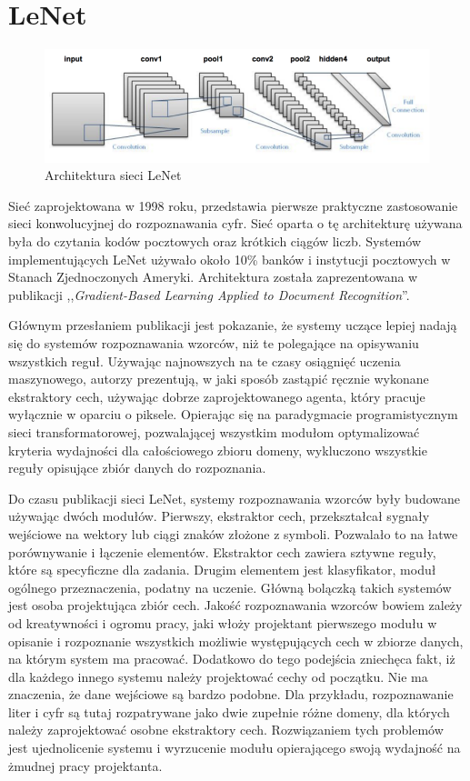 \documentclass[12pt,a4paper,twoside,titlepage,openright]{book}
\begin{document}
\section{LeNet}
\begin{figure}[ht]
	\centering
			\includegraphics[resolution=100, scale=0.6]{LeNet.png}
		\caption{Architektura sieci LeNet}
\end{figure}

Sieć zaprojektowana w 1998 roku, przedstawia pierwsze praktyczne zastosowanie sieci konwolucyjnej do rozpoznawania cyfr. Sieć oparta o tę architekturę używana była do czytania kodów pocztowych oraz krótkich ciągów liczb. Systemów implementujących LeNet używało około 10\% banków i instytucji pocztowych w Stanach Zjednoczonych Ameryki. Architektura została zaprezentowana w publikacji ,,\textit{Gradient-Based Learning Applied to Document Recognition}''.

Głównym przesłaniem publikacji jest pokazanie, że systemy uczące lepiej nadają się do systemów rozpoznawania wzorców, niż te polegające na opisywaniu wszystkich reguł. Używając najnowszych na te czasy osiągnięć uczenia maszynowego, autorzy prezentują, w jaki sposób zastąpić ręcznie wykonane ekstraktory cech, używając dobrze zaprojektowanego agenta, który pracuje wyłącznie w oparciu o piksele. Opierając się na paradygmacie programistycznym sieci transformatorowej, pozwalającej wszystkim modułom optymalizować kryteria wydajności dla całościowego zbioru domeny, wykluczono wszystkie reguły opisujące zbiór danych do rozpoznania.

Do czasu publikacji sieci LeNet, systemy rozpoznawania wzorców były budowane używając dwóch modułów. Pierwszy, ekstraktor cech, przekształcał sygnały wejściowe na wektory lub ciągi znaków złożone z symboli. Pozwalało to na łatwe porównywanie i łączenie elementów. Ekstraktor cech zawiera sztywne reguły, które są specyficzne dla zadania. Drugim elementem jest klasyfikator, moduł ogólnego przeznaczenia, podatny na uczenie. Główną bolączką takich systemów jest osoba projektująca zbiór cech. Jakość rozpoznawania wzorców bowiem zależy od kreatywności i ogromu pracy, jaki włoży projektant pierwszego modułu w opisanie i rozpoznanie wszystkich możliwie występujących cech w zbiorze danych, na którym system ma pracować. Dodatkowo do tego podejścia zniechęca fakt, iż dla każdego innego systemu należy projektować cechy od początku. Nie ma znaczenia, że dane wejściowe są bardzo podobne. Dla przykładu, rozpoznawanie liter i cyfr są tutaj rozpatrywane jako dwie zupełnie różne domeny, dla których należy zaprojektować osobne ekstraktory cech. Rozwiązaniem tych problemów jest ujednolicenie systemu i wyrzucenie modułu opierającego swoją wydajność na żmudnej pracy projektanta.
\end{document}

